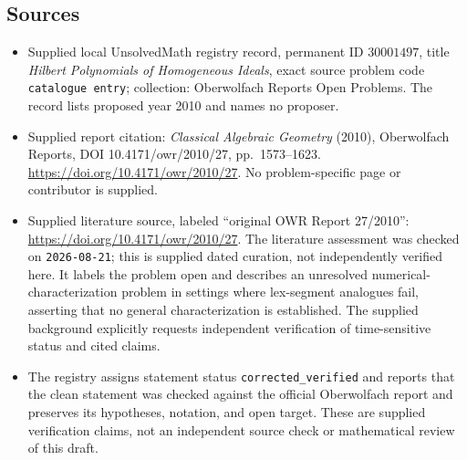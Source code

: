 \documentclass[11pt]{article}
\begin{document}
\subsection{Sources}
\begin{itemize}
\item Supplied local UnsolvedMath registry record, permanent ID \(30001497\), title \emph{Hilbert Polynomials of Homogeneous Ideals}, exact source problem code \texttt{catalogue entry}; collection: Oberwolfach Reports Open Problems. The record lists proposed year 2010 and names no proposer.
\item Supplied report citation: \emph{Classical Algebraic Geometry} (2010), Oberwolfach Reports, DOI 10.4171/owr/2010/27, pp.\ 1573--1623. \url{https://doi.org/10.4171/owr/2010/27}. No problem-specific page or contributor is supplied.
\item Supplied literature source, labeled ``original OWR Report 27/2010'': \url{https://doi.org/10.4171/owr/2010/27}. The literature assessment was checked on \texttt{2026-08-21}; this is supplied dated curation, not independently verified here. It labels the problem open and describes an unresolved numerical-characterization problem in settings where lex-segment analogues fail, asserting that no general characterization is established. The supplied background explicitly requests independent verification of time-sensitive status and cited claims.
\item The registry assigns statement status \texttt{corrected\_verified} and reports that the clean statement was checked against the official Oberwolfach report and preserves its hypotheses, notation, and open target. These are supplied verification claims, not an independent source check or mathematical review of this draft.
\end{itemize}
\end{document}
